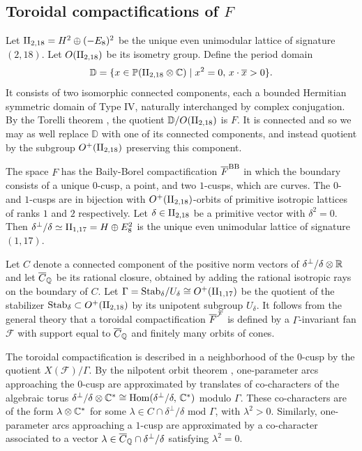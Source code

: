 \documentclass[table,x11names]{amsart}
\begin{document}
\subsection{Toroidal compactifications of $F$}
\label{sec:toroidal-comp}

Let $\II_{2,18} = H^2\oplus (-E_8)^2$ be the unique even unimodular
lattice of signature $(2,18)$. Let $O(\II_{2,18})$ be its
isometry group. Define the period domain
\begin{displaymath}
 \mathbb{D} = \{x\in \bP(\II_{2,18}\otimes \bC) \mid x^2=0,\,
  x\cdot \overline{x} > 0 \}.
\end{displaymath}
It consists of two isomorphic connected components, each a bounded Hermitian
symmetric domain of Type IV, naturally interchanged by complex conjugation.
By the Torelli theorem \cite{piateski-shapiro1971torelli}, 
the quotient $\bD/O(\II_{2,18})$ is $F$. It is connected and so we may
as well replace $\mathbb{D}$ with one of its connected components, and instead quotient
by the subgroup $O^+(\II_{2,18})$ preserving this component.

The space $F$ has the Baily-Borel \cite{baily1966compactification-of-arithmetic} compactification ${\overline F}^{\rm BB}$
in which the boundary consists of a unique $0$-cusp, a point, and two
$1$-cusps, which are curves. The $0$- and $1$-cusps are in bijection
with $O^+(\II_{2,18})$-orbits of primitive isotropic lattices of ranks $1$ and $2$ respectively.
Let $\delta\in \II_{2,18}$ be a primitive vector with $\delta^2=0$.  Then
$\delta^\perp/\delta \simeq \IIell = H\oplus E_8^2$ is the
unique even unimodular lattice of signature $(1,17)$.

Let $C$ denote a connected
component of the positive norm vectors of $\delta^\perp/\delta\otimes {\mathbb R}$ and let
${\overline C}_{{\mathbb Q}}$ be its rational closure, obtained by adding the rational isotropic rays
on the boundary of $C$. Let $\Gamma={\rm Stab}_\delta/U_\delta\cong O^+(\IIell)$
be the quotient of the stabilizer
${\rm Stab}_\delta\subset O^+(\II_{2,18})$
by its unipotent subgroup $U_\delta$.
It follows from the general theory \cite{ash1975smooth-compactifications}
that a toroidal compactification
${\overline F}^{\mathcal F}$ is defined by a $\Gamma$-invariant fan $\mathcal{F}$ with support equal
to ${\overline C}_{\mathbb Q}$ and finitely many orbits of cones.

The toroidal compactification is described in a neighborhood of the $0$-cusp by
the quotient $X(\mathcal{F})/\Gamma$. By the nilpotent orbit theorem
\cite{schmid1973variation, friedman1986type-III},
one-parameter arcs
approaching the $0$-cusp are approximated by translates of co-characters
of the algebraic torus $\delta^\perp/\delta\otimes \mathbb{C}^*\cong \operatorname{Hom}(\delta^\perp/\delta,\,\mathbb{C}^*)$
modulo $\Gamma$. These co-characters are of the form $\lambda\otimes \mathbb{C}^*$
for some $\lambda\in C \cap \delta^\perp/\delta\textrm{ mod }\Gamma$,
with $\lambda^2>0$.
Similarly, one-parameter arcs
approaching a $1$-cusp are approximated by a co-character associated
to a vector $\lambda \in {\overline C}_{\mathbb{Q}}\cap \delta^\perp/\delta$
satisfying $\lambda^2=0$.
\end{document}
